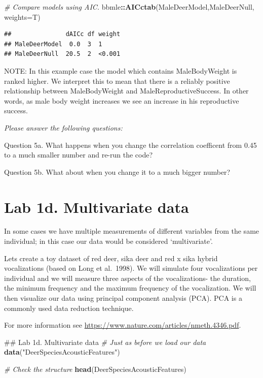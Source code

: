 \documentclass[]{book}
\newenvironment{Shaded}{\begin{snugshade}}{\end{snugshade}}
\newcommand{\CommentTok}[1]{\textcolor[rgb]{0.56,0.35,0.01}{\textit{#1}}}
\newcommand{\DataTypeTok}[1]{\textcolor[rgb]{0.13,0.29,0.53}{#1}}
\newcommand{\KeywordTok}[1]{\textcolor[rgb]{0.13,0.29,0.53}{\textbf{#1}}}
\newcommand{\NormalTok}[1]{#1}
\newcommand{\OperatorTok}[1]{\textcolor[rgb]{0.81,0.36,0.00}{\textbf{#1}}}
\newcommand{\StringTok}[1]{\textcolor[rgb]{0.31,0.60,0.02}{#1}}
\begin{document}
\begin{Shaded}
\begin{Highlighting}[]
\CommentTok{# Compare models using AIC.}
\NormalTok{bbmle}\OperatorTok{::}\KeywordTok{AICctab}\NormalTok{(MaleDeerModel,MaleDeerNull, }\DataTypeTok{weights=}\NormalTok{T)}
\end{Highlighting}
\end{Shaded}

\begin{verbatim}
##               dAICc df weight
## MaleDeerModel  0.0  3  1     
## MaleDeerNull  20.5  2  <0.001
\end{verbatim}

NOTE: In this example case the model which contains MaleBodyWeight is ranked higher. We interpret this to mean that there is a reliably positive relationship between MaleBodyWeight and MaleReproductiveSuccess. In other words, as male body weight increases we see an increase in his reproductive success.

\emph{Please answer the following questions:}

Question 5a. What happens when you change the correlation coefficent from 0.45 to a much smaller number and re-run the code?

Question 5b. What about when you change it to a much bigger number?

\hypertarget{lab-1d.-multivariate-data}{%
\section*{Lab 1d. Multivariate data}\label{lab-1d.-multivariate-data}}

In some cases we have multiple measurements of different variables from the same individual; in this case our data would be considered `multivariate'.

Lets create a toy dataset of red deer, sika deer and red x sika hybrid vocalizations (based on Long et al.~1998). We will simulate four vocalizations per individual and we will measure three aspects of the vocalizations- the duration, the minimum frequency and the maximum frequency of the vocalization. We will then visualize our data using principal component analysis (PCA). PCA is a commonly used data reduction technique.

For more information see \url{https://www.nature.com/articles/nmeth.4346.pdf}.

\begin{Shaded}
\begin{Highlighting}[]
\NormalTok{## Lab 1d. Multivariate data}
\CommentTok{# Just as before we load our data}
\KeywordTok{data}\NormalTok{(}\StringTok{"DeerSpeciesAcousticFeatures"}\NormalTok{)}

\CommentTok{# Check the structure}
\KeywordTok{head}\NormalTok{(DeerSpeciesAcousticFeatures)}
\end{Highlighting}
\end{Shaded}
\end{document}

